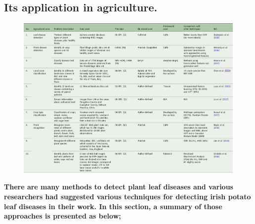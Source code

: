 \documentclass[11pt]{report}
\begin{document}
\newpage
\subsection{Its application in agriculture.}
\begin{figure}[h]
	\centerline{\small 
		\includegraphics[height=0.5\textheight]  {agric}}
\end{figure}


\textbf{There are many methods to detect plant leaf diseases and various researchers had suggested various techniques for detecting irish potato leaf diseases in their work. In this section, a summary of those approaches is presented as below;}\\
\end{document}
